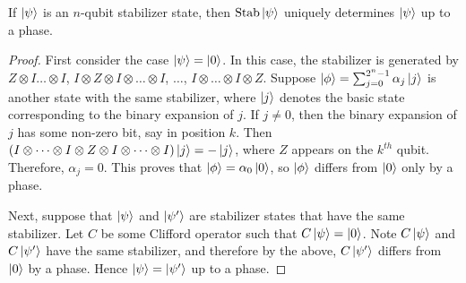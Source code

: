 \documentclass[12pt]{dalthesis}
\begin{document}
\begin{theorem}
\label{Unique}
If $\ket{\psi}$ is an $n$-qubit stabilizer state, then $\mathrm{Stab}\ket{\psi}$ uniquely determines $\ket{\psi}$ up to a phase.
\end{theorem}
\begin{proof}
First consider the case $\ket{\psi} = \ket{0}$. In this case, the stabilizer is generated by $Z \otimes I \dots \otimes I$, $I \otimes Z \otimes I \otimes \dots \otimes I$, $\dots$, $I \otimes \dots \otimes I \otimes Z$. Suppose $\ket{\phi} = \sum_{j=0}^{2^n-1} \alpha_j \ket{j}$ is another state with the same stabilizer, where $\ket{j}$ denotes the basic state corresponding to the binary expansion of $j$. If $j \neq 0$, then the binary expansion of $j$ has some non-zero bit, say in position $k$. Then $(I \otimes \cdots \otimes I \otimes Z \otimes I \otimes \cdots \otimes I) \ket{j} = -\ket{j}$, where $Z$ appears on the $k^{th}$ qubit. Therefore, $\alpha_j = 0$. This proves that $\ket{\phi} = \alpha_0 \ket{0}$, so $\ket{\phi}$ differs from $\ket{0}$ only by a phase.

Next, suppose that $\ket{\psi}$ and $\ket{\psi '}$ are stabilizer states that have the same stabilizer. Let $C$ be some Clifford operator such that $C\ket{\psi} = \ket{0}$. Note $C\ket{\psi}$ and $C\ket{\psi '}$ have the same stabilizer, and therefore by the above, $C\ket{\psi '}$ differs from $\ket{0}$ by a phase. Hence $\ket{\psi} = \ket{\psi '}$ up to a phase.



\end{proof}
\end{document}
